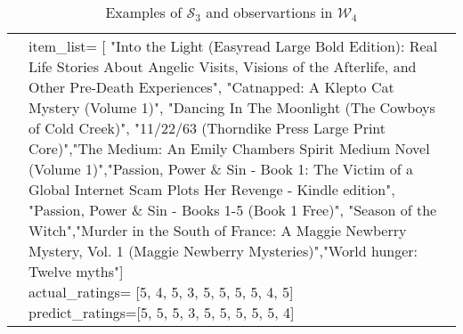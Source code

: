 \begin{table*}[h!]
{\begin{tabular}{ll}
      \multicolumn{1}{l}{} &
      \parbox{0.75\textwidth}{item\_list= [ "Into the Light (Easyread Large Bold Edition): Real Life Stories About Angelic Visits, Visions of the Afterlife, and Other Pre-Death Experiences", "Catnapped: A Klepto Cat Mystery (Volume 1)", "Dancing In The Moonlight (The Cowboys of Cold Creek)", "11/22/63 (Thorndike Press Large Print Core)","The Medium: An Emily Chambers Spirit Medium Novel (Volume 1)","Passion, Power \& Sin - Book 1: The Victim of a Global Internet Scam Plots Her Revenge - Kindle edition", "Passion, Power \& Sin - Books 1-5 (Book 1 Free)", "Season of the Witch","Murder in the South of France: A Maggie Newberry Mystery, Vol. 1 (Maggie Newberry Mysteries)","World hunger: Twelve myths"]\\
  
      actual\_ratings= [5, 4, 5, 3, 5, 5, 5, 5, 4, 5]\\
      predict\_ratings=[5, 5, 5, 3, 5, 5, 5, 5, 5, 4]} \\ \bottomrule
  
      \end{tabular}
      }
      \caption{Examples of $\mathcal{S}_3$ and observartions in $\mathcal{W}_4$}
      \label{tab:persona_evolve_4}
      \end{table*}
  


    \newpage

